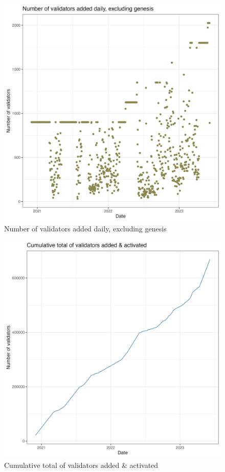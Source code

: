 \documentclass[UTF8]{article}
\begin{document}
{\begin{figure}[htbp]
\begin{center}
\includegraphics[width=\linewidth]{images/daily_validator_plot_no_genesis_pt_no_smoothing_230607}             %
\caption{Number of validators added daily, excluding genesis}
\label{fig:dailyvalidator3}
\end{center}
\end{figure}

\begin{figure}[htbp]
\begin{center}
\includegraphics[width=\linewidth]{images/cumulative_validator_plot_230607}
\caption{Cumulative total of validators added \& activated}
\label{fig:cumulativevalidators}
\end{center}
\end{figure}


}
\end{document}
